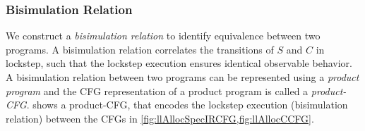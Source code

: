 \subsubsection{Bisimulation Relation}
\label{sec:syn-bisim}
We construct a {\em bisimulation relation} to identify equivalence between two programs.
A bisimulation relation correlates the transitions of $S$ and $C$ in lockstep, such that the
lockstep execution ensures identical observable behavior.
A bisimulation relation between two programs can be represented using a {\em product program}
\cite{covac} and the CFG representation of a product program is called a {\em product-CFG}.
 shows a product-CFG, that encodes the lockstep execution
(bisimulation relation) between the CFGs in \cref{fig:llAllocSpecIRCFG,fig:llAllocCCFG}.



